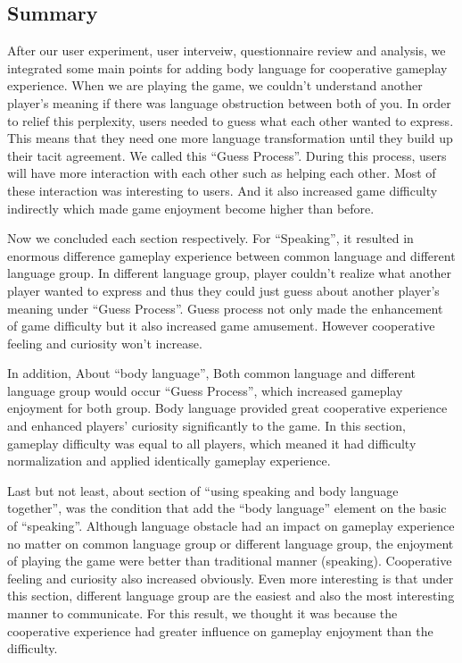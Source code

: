 \subsection{Summary}
After our user experiment, user interveiw, questionnaire review and analysis, we integrated some main points for adding body language for cooperative gameplay experience. When we are playing the game, we couldn't understand another player's meaning if there was language obstruction between both of you. In order to relief this perplexity, users needed to guess what each other wanted to express. This means that they need one more language transformation until they build up their tacit agreement. We called this ``Guess Process''. During this process, users will have more interaction with each other such as helping each other. Most of these interaction was interesting to users. And it also increased game difficulty indirectly which made game enjoyment become higher than before.

Now we concluded each section respectively. For ``Speaking'', it resulted in enormous difference gameplay experience between common language and different language group. In different language group, player couldn't realize what another player wanted to express and thus they could just guess about another player's meaning under ``Guess Process''. Guess process not only made the enhancement of game difficulty but it also increased game amusement. However cooperative feeling and curiosity won't increase. 

In addition, About ``body language'', Both common language and different language group would occur ``Guess Process'', which increased gameplay enjoyment for both group. Body language provided great cooperative experience and enhanced players' curiosity significantly to the game. In this section, gameplay difficulty was equal to all players, which meaned it had difficulty normalization and applied identically gameplay experience.

Last but not least, about section of ``using speaking and body language together'', was the condition that add the ``body language'' element on the basic of ``speaking''. Although language obstacle had an impact on gameplay experience no matter on common language group or different language group, the enjoyment of playing the game were better than traditional manner (speaking). Cooperative feeling and curiosity also increased obviously. Even more interesting is that under this section, different language group are the easiest and also the most interesting manner to communicate. For this result, we thought it was because the cooperative experience had greater influence on gameplay enjoyment than the difficulty.



